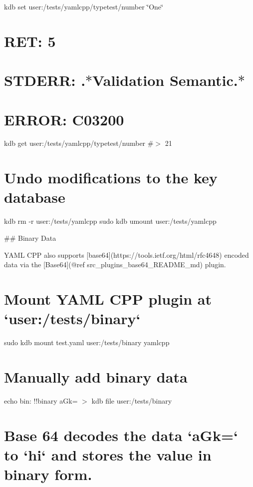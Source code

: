 kdb set user\+:/tests/yamlcpp/typetest/number \char`\"{}\+One\char`\"{} \hypertarget{autotoc_md807_autotoc_md856}{}\section{R\+E\+T\+: 5}\label{autotoc_md807_autotoc_md856}
\hypertarget{autotoc_md807_autotoc_md857}{}\section{S\+T\+D\+E\+R\+R\+: .$\ast$\+Validation Semantic.$\ast$}\label{autotoc_md807_autotoc_md857}
\hypertarget{autotoc_md807_autotoc_md858}{}\section{E\+R\+R\+O\+R\+: C03200}\label{autotoc_md807_autotoc_md858}
kdb get user\+:/tests/yamlcpp/typetest/number \#$>$ 21\hypertarget{autotoc_md807_autotoc_md859}{}\section{Undo modifications to the key database}\label{autotoc_md807_autotoc_md859}
kdb rm -\/r user\+:/tests/yamlcpp sudo kdb umount user\+:/tests/yamlcpp 
\begin{DoxyCode}
## Binary Data

YAML CPP also supports [base64](https://tools.ietf.org/html/rfc4648) encoded data via the [Base64](@ref
       src\_plugins\_base64\_README\_md) plugin.
\end{DoxyCode}
 \hypertarget{autotoc_md807_autotoc_md860}{}\section{Mount Y\+A\+M\+L C\+P\+P plugin at `user\+:/tests/binary`}\label{autotoc_md807_autotoc_md860}
sudo kdb mount test.\+yaml user\+:/tests/binary yamlcpp \hypertarget{autotoc_md807_autotoc_md861}{}\section{Manually add binary data}\label{autotoc_md807_autotoc_md861}
echo \textquotesingle{}bin\+: !!binary a\+Gk=\textquotesingle{} $>$ {\ttfamily kdb file user\+:/tests/binary}\hypertarget{autotoc_md807_autotoc_md862}{}\section{Base 64 decodes the data `a\+Gk=` to `hi` and stores the value in binary form.}\label{autotoc_md807_autotoc_md862}
